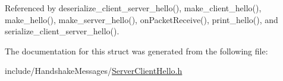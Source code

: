 Referenced by deserialize\+\_\+client\+\_\+server\+\_\+hello(), make\+\_\+client\+\_\+hello(), make\+\_\+hello(), make\+\_\+server\+\_\+hello(), on\+Packet\+Receive(), print\+\_\+hello(), and serialize\+\_\+client\+\_\+server\+\_\+hello().



The documentation for this struct was generated from the following file\+:\begin{DoxyCompactItemize}
\item 
include/\+Handshake\+Messages/\hyperlink{_server_client_hello_8h}{Server\+Client\+Hello.\+h}\end{DoxyCompactItemize}
